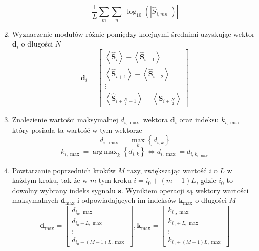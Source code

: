 \documentclass[pl,12pt]{aghdpl}
\DeclareMathOperator*{\argmax}{arg\,max}
\begin{document}
\begin{enumerate}
\begin{equation}
      \frac{1}{L}\sum_m\sum_n\left|\log_{10}
      \left(\left|\hat{S}_{i, mn}\right|\right)\right|
    \end{equation}
  \item Wyznaczenie modułów różnic pomiędzy kolejnymi średnimi uzyskując
    wektor $\bm d_i$ o długości $N$
    \begin{equation}
      \bm d_i = \begin{bmatrix}
        \left<\hat{\bm S}_i\right> - \left<\hat{\bm S}_{i+1}\right>\\
        \left<\hat{\bm S}_{i+1}\right> - \left<\hat{\bm S}_{i+2}\right>\\
        \vdots\\
        \left<\hat{\bm S}_{i+\frac{N}{2}-1}\right> - \left<\hat{\bm S}_{i+\frac{N}{2}}\right>
      \end{bmatrix}
    \end{equation}
    \item Znalezienie wartości maksymalnej $d_{i,\max}$ wektora $\bm d_i$ oraz
      indeksu $k_{i,\max}$ który posiada ta wartość w tym wektorze
      \begin{equation}
        d_{i,\max} = \max_k\left\{d_{i, k}\right\}
      \end{equation}
      \begin{equation}
        k_{i,\max} = \argmax_k\left\{d_{i,k}\right\} \iff d_{i,\max} =
        d_{i,k_{i,\max}}
      \end{equation}
    \item Powtarzanie poprzednich kroków $M$ razy, zwiększając wartość $i$ o $L$
      w każdym kroku, tak że w $m$-tym kroku $i = i_0 + (m-1)L$, gdzie $i_0$ to
      dowolny wybrany indeks sygnału $\bm s$. Wynikiem operacji są wektory
      wartości maksymalnych $\bm d_{\max}$ i odpowiadających im indeksów $\bm
      k_{\max}$ o długości $M$
      \begin{equation}
        \bm d_{\max} = \begin{bmatrix}
          d_{i_0,\max}\\
          d_{i_0+L,\max}\\
          \vdots\\
          d_{i_0+(M-1)L,\max}
        \end{bmatrix},
        \bm k_{\max} = \begin{bmatrix}
          k_{i_0,\max}\\
          k_{i_0+L,\max}\\
          \vdots\\
          k_{i_0+(M-1)L,\max}

\end{bmatrix}
\end{equation}
\end{enumerate}
\end{document}
